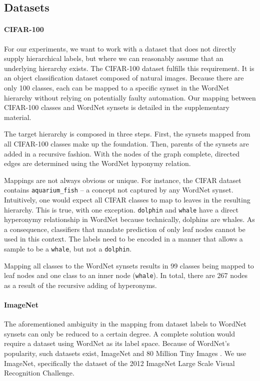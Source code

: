 \documentclass[10pt,twocolumn,letterpaper]{article}
\begin{document}
\subsection{Datasets}
\label{sec:expdata}
\paragraph{CIFAR-100}
For our experiments, we want to work with a dataset that does not directly supply hierarchical labels,
but where we can reasonably assume that an underlying hierarchy exists.
The CIFAR-100 dataset \cite{Krizhevsky2009CIFAR} fulfills this requirement. It is an
object classification dataset composed of natural images. Because there are only 100
classes, each can be mapped to a specific synset in the WordNet hierarchy without
relying on potentially faulty automation.
Our mapping between CIFAR-100 classes and WordNet synsets is detailed in the supplementary material.

The target hierarchy is composed in three steps. First, the synsets mapped from all CIFAR-100
classes make up the foundation. Then, parents of the synsets are added in a recursive fashion.
With the nodes of the graph complete, directed edges are determined using the WordNet
hyponymy relation.


Mappings are not always obvious or unique. For instance, the CIFAR dataset contains
\texttt{aquarium\_fish} -- a concept not captured by any WordNet synset.
Intuitively, one would expect all CIFAR classes to map to leaves in the resulting
hierarchy. This is true, with one exception. \texttt{dolphin} and \texttt{whale} have
a direct hyperonymy relationship in WordNet because technically, dolphins are whales.
As a consequence, classifiers that mandate prediction of only leaf nodes cannot be
used in this context. The labels need to be encoded in a manner that allows a sample
to be a \texttt{whale}, but not a \texttt{dolphin}.

Mapping all classes to the WordNet synsets results in 99 classes being mapped to leaf nodes
and one class to an inner node (\texttt{whale}). In total, there are 267 nodes as a result of
the recursive adding of hyperonyms. 

\paragraph{ImageNet} 
The aforementioned ambiguity in the mapping from dataset labels to WordNet synsets
can only be reduced to a certain degree. A complete solution would require a
dataset using WordNet as its label space. Because of WordNet's popularity, such
datasets exist, \eg ImageNet \cite{Deng2009ImageNet} and 80 Million Tiny Images \cite{Torralba2008Tiny}.
We use ImageNet, specifically the dataset of the 2012 ImageNet Large Scale Visual Recognition Challenge.
\end{document}
